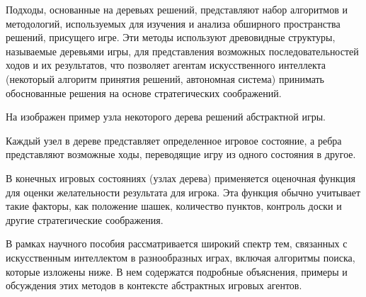Подходы, основанные на деревьях решений, представляют набор алгоритмов и методологий, используемых для изучения и анализа обширного пространства решений, присущего игре. Эти методы используют древовидные структуры, называемые деревьями игры, для представления возможных последовательностей ходов и их результатов, что позволяет агентам искусственного интеллекта (некоторый алгоритм принятия решений, автономная система) принимать обоснованные решения на основе стратегических соображений.

На  изображен пример узла некоторого дерева решений абстрактной игры.


Каждый узел в дереве представляет определенное игровое состояние, а ребра представляют возможные ходы, переводящие игру из одного состояния в другое.

В конечных игровых состояниях (узлах дерева) применяется оценочная функция для оценки желательности результата для игрока. Эта функция обычно учитывает такие факторы, как положение шашек, количество пунктов, контроль доски и другие стратегические соображения.

В рамках научного пособия \cite{ai-modern-approach} рассматривается широкий спектр тем, связанных с искусственным интеллектом в разнообразных играх, включая алгоритмы поиска, которые изложены ниже. В нем содержатся подробные объяснения, примеры и обсуждения этих методов в контексте абстрактных игровых агентов.
